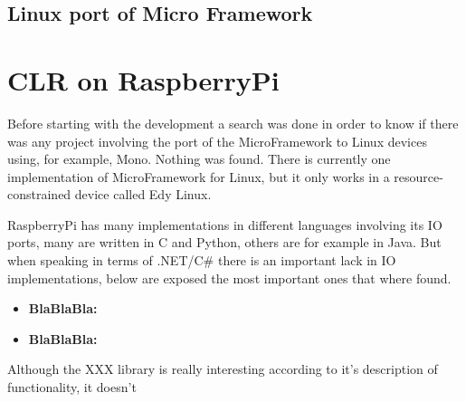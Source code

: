 \subsection{Linux port of Micro Framework}\label{SS:MicroFramework-Devices}

\section{CLR on RaspberryPi}\label{S:CLR-RaspberryPi}
Before starting with the development a search was done in order to know if there was any project involving the port of the MicroFramework to Linux devices using, for example, Mono. Nothing was found.
There is currently one implementation of MicroFramework for Linux, but it only works in a resource-constrained device called Edy Linux.

RaspberryPi has many implementations in different languages involving its IO ports, many are written in C and Python, others are for example in Java. But when speaking in terms of .NET/C\# there is an important lack in IO implementations, below are exposed the most important ones that where found.

\begin{itemize}
\item \textbf{BlaBlaBla:}
\item \textbf{BlaBlaBla:}
\end{itemize}

Although the XXX library is really interesting according to it's description of functionality, it doesn't 